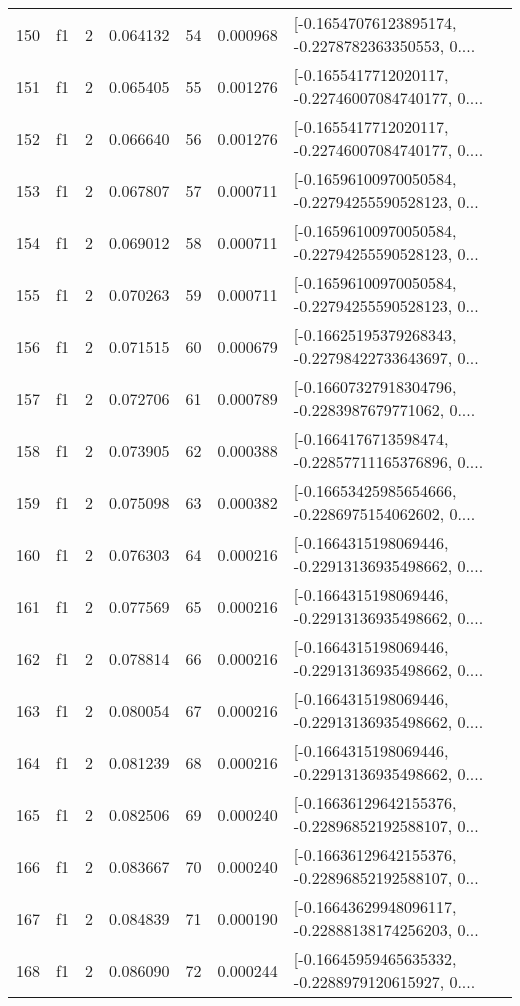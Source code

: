 \begin{tabular}{lllrlrl}
150 &  f1 &   2 &  0.064132 &   54 &  0.000968 &  [-0.16547076123895174, -0.2278782363350553, 0.... \\
151 &  f1 &   2 &  0.065405 &   55 &  0.001276 &  [-0.1655417712020117, -0.22746007084740177, 0.... \\
152 &  f1 &   2 &  0.066640 &   56 &  0.001276 &  [-0.1655417712020117, -0.22746007084740177, 0.... \\
153 &  f1 &   2 &  0.067807 &   57 &  0.000711 &  [-0.16596100970050584, -0.22794255590528123, 0... \\
154 &  f1 &   2 &  0.069012 &   58 &  0.000711 &  [-0.16596100970050584, -0.22794255590528123, 0... \\
155 &  f1 &   2 &  0.070263 &   59 &  0.000711 &  [-0.16596100970050584, -0.22794255590528123, 0... \\
156 &  f1 &   2 &  0.071515 &   60 &  0.000679 &  [-0.16625195379268343, -0.22798422733643697, 0... \\
157 &  f1 &   2 &  0.072706 &   61 &  0.000789 &  [-0.16607327918304796, -0.2283987679771062, 0.... \\
158 &  f1 &   2 &  0.073905 &   62 &  0.000388 &  [-0.1664176713598474, -0.22857711165376896, 0.... \\
159 &  f1 &   2 &  0.075098 &   63 &  0.000382 &  [-0.16653425985654666, -0.2286975154062602, 0.... \\
160 &  f1 &   2 &  0.076303 &   64 &  0.000216 &  [-0.1664315198069446, -0.22913136935498662, 0.... \\
161 &  f1 &   2 &  0.077569 &   65 &  0.000216 &  [-0.1664315198069446, -0.22913136935498662, 0.... \\
162 &  f1 &   2 &  0.078814 &   66 &  0.000216 &  [-0.1664315198069446, -0.22913136935498662, 0.... \\
163 &  f1 &   2 &  0.080054 &   67 &  0.000216 &  [-0.1664315198069446, -0.22913136935498662, 0.... \\
164 &  f1 &   2 &  0.081239 &   68 &  0.000216 &  [-0.1664315198069446, -0.22913136935498662, 0.... \\
165 &  f1 &   2 &  0.082506 &   69 &  0.000240 &  [-0.16636129642155376, -0.22896852192588107, 0... \\
166 &  f1 &   2 &  0.083667 &   70 &  0.000240 &  [-0.16636129642155376, -0.22896852192588107, 0... \\
167 &  f1 &   2 &  0.084839 &   71 &  0.000190 &  [-0.16643629948096117, -0.22888138174256203, 0... \\
168 &  f1 &   2 &  0.086090 &   72 &  0.000244 &  [-0.16645959465635332, -0.2288979120615927, 0.... \\

\end{tabular}
